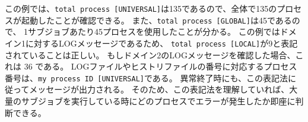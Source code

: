 この例では、\verb|total process [UNIVERSAL]|は135であるので、全体で135のプロセスが起動したことが確認できる。
また、\verb|total process [GLOBAL]|は45であるので、
1サブジョブあたり45プロセスを使用したことが分かる。
この例ではドメイン1に対するLOGメッセージであるため、
\verb|total process [LOCAL]|が9と表記されていることは正しい。
もしドメイン2のLOGメッセージを確認した場合、これは 36 である。
LOGファイルやヒストリファイルの番号に対応するプロセス番号は、\verb|my process ID [UNIVERSAL]|である。
異常終了時にも、この表記法に従ってメッセージが出力される。
そのため、この表記法を理解していれば、大量のサブジョブを実行している時にどのプロセスでエラーが発生したか即座に判断できる。

